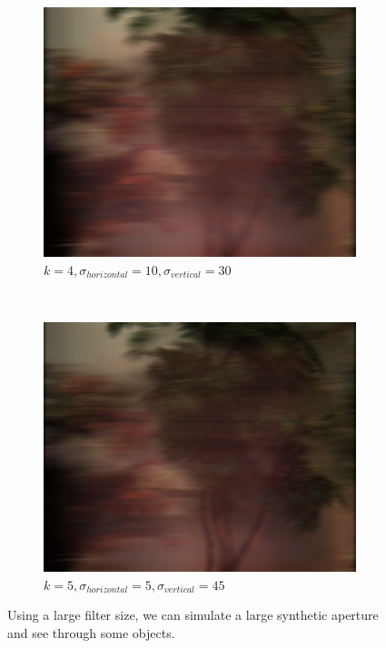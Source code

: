 \documentclass[a4paper]{article}
\begin{document}
\begin{figure}[ht]
	\begin{subfigure}[h]{0.48\textwidth}
	  \includegraphics[width=\textwidth]{shearedGauss_k20_shear5_sighor10_sigvert30}
	  \caption*{$k=4,\sigma_{horizontal} = 10, \sigma_{vertical} = 30$}
	\end{subfigure}
    	~
	\begin{subfigure}[h]{0.48\textwidth}
	  \includegraphics[width=\textwidth]{shearedGauss_k5_shear5_sighor5_sigvert45}
	  \caption*{$k=5, \sigma_{horizontal} = 5, \sigma_{vertical} = 45$}
	\end{subfigure}
\caption{Using a large filter size, we can simulate a large synthetic aperture and see through some objects.}
\label{fig:seeThrough}
\end{figure}
\end{document}

